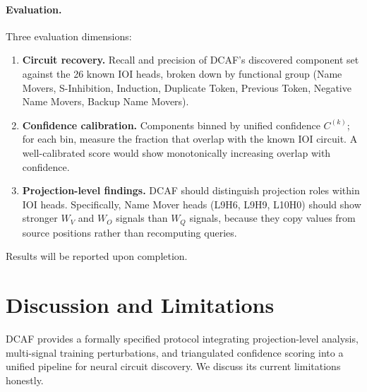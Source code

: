 \documentclass[11pt]{article}
\begin{document}
\paragraph{Evaluation.} Three evaluation dimensions:
\begin{enumerate}[nosep]
\item \textbf{Circuit recovery.} Recall and precision of DCAF's discovered component set against the 26 known IOI heads, broken down by functional group (Name Movers, S-Inhibition, Induction, Duplicate Token, Previous Token, Negative Name Movers, Backup Name Movers).
\item \textbf{Confidence calibration.} Components binned by unified confidence $C^{(k)}$; for each bin, measure the fraction that overlap with the known IOI circuit. A well-calibrated score would show monotonically increasing overlap with confidence.
\item \textbf{Projection-level findings.} DCAF should distinguish projection roles within IOI heads. Specifically, Name Mover heads (L9H6, L9H9, L10H0) should show stronger $W_V$ and $W_O$ signals than $W_Q$ signals, because they copy values from source positions rather than recomputing queries.
\end{enumerate}

Results will be reported upon completion.

\section{Discussion and Limitations}
\label{sec:limitations}

DCAF provides a formally specified protocol integrating projection-level analysis, multi-signal training perturbations, and triangulated confidence scoring into a unified pipeline for neural circuit discovery. We discuss its current limitations honestly.
\end{document}
